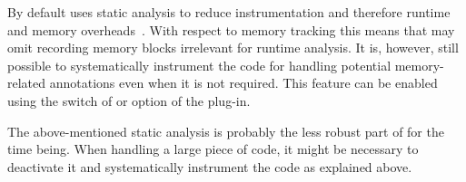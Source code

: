 By default \eacsl uses static analysis to reduce instrumentation and therefore
runtime and memory overheads~\cite{ly18hilt}. With respect to memory tracking
this means that
\eacsl may omit recording memory blocks irrelevant for runtime analysis.  It
is, however, still possible to systematically instrument the code for handling
potential memory-related annotations even when it is not required.  This
feature can be enabled using the  switch of \eacslgcc or
 option of the \eacsl plug-in.

\begin{important}
  The above-mentioned static analysis is probably the less robust part of \eacsl
  for the time being. When handling a large piece of code, it might be necessary
  to deactivate it and systematically instrument the code as explained above.
\end{important}








